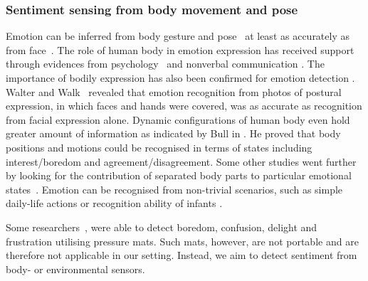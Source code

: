 \documentclass[12pt]{article}
\begin{document}
\subsubsection*{Sentiment sensing from body movement and pose}
Emotion can be inferred from body gesture and pose~\cite{Pervasive_Jaggarwal_2012} at least as accurately as from face~\cite{Emotion_Nguyen_2012,Emotion_Castellano_2008,Emotion_Meeren_2005}.
The role of human body in emotion expression has received support through evidences from psychology~\cite{Emotion_Walters_1986} and nonverbal communication \cite{Emotion_Dittmann_1978}. 
The importance of  bodily expression has also been confirmed for emotion detection \cite{Emotion_Wallbott_1998, Emotion_VanHeijnsbergen_2007,Emotion_Atkinson_2007}. 
Walter and Walk~\cite{Emotion_Walters_1986} revealed that emotion recognition from photos of postural expression, in which faces and hands were covered, was as accurate as recognition from facial expression alone.
Dynamic configurations of human body even hold greater amount of information as indicated by Bull in \cite{Emotion_Bull_1987}. 
He proved that body positions and motions could be recognised in terms of states including interest/boredom and agreement/disagreement. 
Some other studies went further by looking for the contribution of separated body parts to particular emotional states~\cite{Emotion_DeMeijer_1989,Emotion_Montepare_1999}.
Emotion can be recognised from non-trivial scenarios, such as simple daily-life actions \cite{Emotion_Crane_2007,Emotion_Bernhardt_2007} or recognition ability of infants \cite{Emotion_Lagerlof_2009}. 


Some researchers~\cite{SentimentSensing_Mota_2003,SentimentSesing_Mello_2009}, were able to detect boredom, confusion, delight and frustration utilising pressure mats. 
Such mats, however, are not portable and are therefore not applicable in our setting. 
Instead, we aim to detect sentiment from body- or environmental sensors. 
\end{document}
